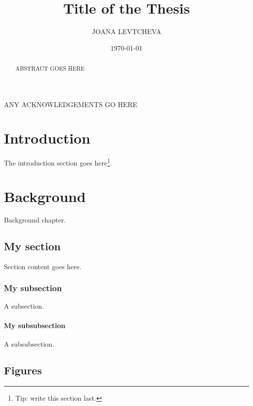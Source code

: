 \documentclass{mldsmsc}
\title{Title of the Thesis}
\author{JOANA LEVTCHEVA}
\date{\today}
\begin{document}
\maketitle


\declaration 


\begin{abstract}
    ABSTRACT GOES HERE
\end{abstract}

\begin{acknowledgements}
    ANY ACKNOWLEDGEMENTS GO HERE
\end{acknowledgements}


\tableofcontents

\mainmatter


\chapter{Introduction}

The introduction section goes here\footnote{Tip: write this section last.}.

\chapter{Background}

Background chapter.

\section{My section}

Section content goes here. 

\subsection{My subsection}

A subsection.

\subsubsection{My subsubsection}

A subsubsection.

\section{Figures}
\end{document}
